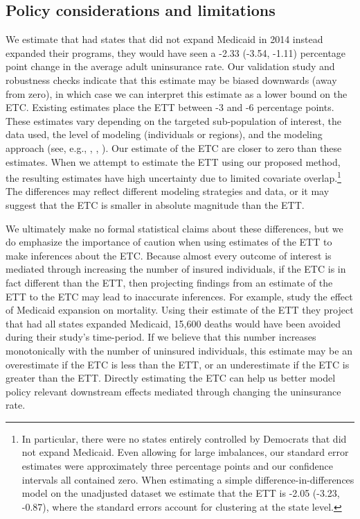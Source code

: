\documentclass[aoas]{imsart}
\theoremstyle{plain}
\theoremstyle{remark}
\begin{document}
\subsection{Policy considerations and limitations}

We estimate that had states that did not expand Medicaid in 2014 instead expanded their programs, they would have seen a -2.33 (-3.54, -1.11) percentage point change in the average adult uninsurance rate. Our validation study and robustness checks indicate that this estimate may be biased downwards (away from zero), in which case we can interpret this estimate as a lower bound on the ETC. Existing estimates place the ETT between -3 and -6 percentage points. These estimates vary depending on the targeted sub-population of interest, the data used, the level of modeling (individuals or regions), and the modeling approach (see, e.g., \cite{courtemanche2017early}, \cite{kaestner2017effects}, \cite{frean2017premium}). Our estimate of the ETC are closer to zero than these estimates. When we attempt to estimate the ETT using our proposed method, the resulting estimates have high uncertainty due to limited covariate overlap.\footnote{In particular, there were no states entirely controlled by Democrats that did not expand Medicaid. Even allowing for large imbalances, our standard error estimates were approximately three percentage points and our confidence intervals all contained zero. When estimating a simple difference-in-differences model on the unadjusted dataset we estimate that the ETT is -2.05 (-3.23, -0.87), where the standard errors account for clustering at the state level.\label{footnote_did}} The differences may reflect different modeling strategies and data, or it may suggest that the ETC is smaller in absolute magnitude than the ETT.

We ultimately make no formal statistical claims about these differences, but we do emphasize the importance of caution when using estimates of the ETT to make inferences about the ETC. Because almost every outcome of interest is mediated through increasing the number of insured individuals, if the ETC is in fact different than the ETT, then projecting findings from an estimate of the ETT to the ETC may lead to inaccurate inferences. For example, \cite{miller2019medicaid} study the effect of Medicaid expansion on mortality. Using their estimate of the ETT they project that had all states expanded Medicaid, 15,600 deaths would have been avoided during their study's time-period. If we believe that this number increases monotonically with the number of uninsured individuals, this estimate may be an overestimate if the ETC is less than the ETT, or an underestimate if the ETC is greater than the ETT. Directly estimating the ETC can help us better model policy relevant downstream effects mediated through changing the uninsurance rate. 
\end{document}
